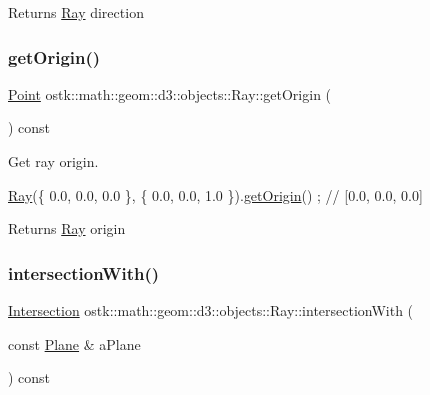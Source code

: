 \begin{DoxyReturn}{Returns}
\hyperlink{classostk_1_1math_1_1geom_1_1d3_1_1objects_1_1_ray}{Ray} direction 
\end{DoxyReturn}
\mbox{\label{classostk_1_1math_1_1geom_1_1d3_1_1objects_1_1_ray_a8c47fac4d487986b538b8168484527c2}} 
\subsubsection{\texorpdfstring{get\+Origin()}{getOrigin()}}
{\footnotesize\ttfamily \hyperlink{classostk_1_1math_1_1geom_1_1d3_1_1objects_1_1_point}{Point} ostk\+::math\+::geom\+::d3\+::objects\+::\+Ray\+::get\+Origin (\begin{DoxyParamCaption}{ }\end{DoxyParamCaption}) const}



Get ray origin. 


\begin{DoxyCode}
\hyperlink{classostk_1_1math_1_1geom_1_1d3_1_1objects_1_1_ray_a78335698f8a4f72e613e607b13121df0}{Ray}(\{ 0.0, 0.0, 0.0 \}, \{ 0.0, 0.0, 1.0 \}).\hyperlink{classostk_1_1math_1_1geom_1_1d3_1_1objects_1_1_ray_a8c47fac4d487986b538b8168484527c2}{getOrigin}() ; \textcolor{comment}{// [0.0, 0.0, 0.0]}
\end{DoxyCode}


\begin{DoxyReturn}{Returns}
\hyperlink{classostk_1_1math_1_1geom_1_1d3_1_1objects_1_1_ray}{Ray} origin 
\end{DoxyReturn}
\mbox{\label{classostk_1_1math_1_1geom_1_1d3_1_1objects_1_1_ray_aa4625c2dfe200ab9df245d2a4dc92f64}} 
\subsubsection{\texorpdfstring{intersection\+With()}{intersectionWith()}\hspace{0.1cm}{\footnotesize\ttfamily [1/3]}}
{\footnotesize\ttfamily \hyperlink{classostk_1_1math_1_1geom_1_1d3_1_1_intersection}{Intersection} ostk\+::math\+::geom\+::d3\+::objects\+::\+Ray\+::intersection\+With (\begin{DoxyParamCaption}\item[{const \hyperlink{classostk_1_1math_1_1geom_1_1d3_1_1objects_1_1_plane}{Plane} \&}]{a\+Plane }\end{DoxyParamCaption}) const}




